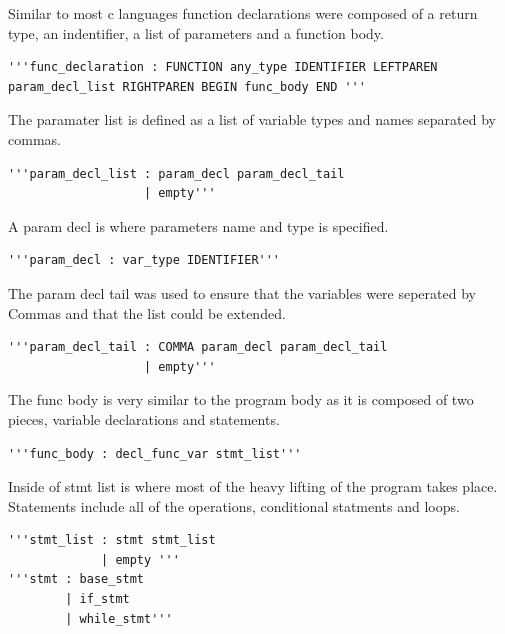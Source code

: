 \documentclass[12pt]{article}
\begin{document}
            Similar to most c languages function declarations were composed of a return type, an indentifier, a list of parameters and a function body.
            
            \begin{verbatim}
'''func_declaration : FUNCTION any_type IDENTIFIER LEFTPAREN
param_decl_list RIGHTPAREN BEGIN func_body END '''
           \end{verbatim}
           
           The paramater list is defined as a list of variable types and names separated by commas.
           
            \begin{verbatim}
'''param_decl_list : param_decl param_decl_tail
                   | empty'''
           \end{verbatim}
           
			A param decl is where parameters name and type is specified.
			
			\begin{verbatim}
'''param_decl : var_type IDENTIFIER'''
           \end{verbatim}
			            
           The param decl tail was used to ensure that the variables were seperated by Commas and that the list could be extended.
           
           \begin{verbatim}
'''param_decl_tail : COMMA param_decl param_decl_tail
                   | empty'''
           \end{verbatim}
           
           The func body is very similar to the program body as it is composed of two pieces, variable declarations and statements.
           
           \begin{verbatim}
'''func_body : decl_func_var stmt_list'''
           \end{verbatim}
           
           Inside of stmt list is where most of the heavy lifting of the program takes place.  Statements include all of the operations, conditional statments and loops.
           
            \begin{verbatim}
'''stmt_list : stmt stmt_list
             | empty '''
'''stmt : base_stmt
        | if_stmt
        | while_stmt'''
           \end{verbatim}
           
\end{document}
